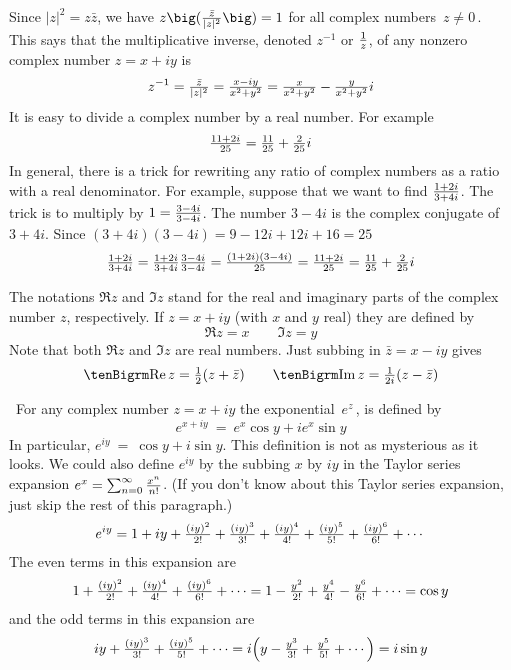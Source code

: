 Since $|z|^2=z\bar z$, we have $z\big({ \bar z\over |z|^2}\big)=1$
for all complex numbers $\, z\ne 0\, $. This says that the multiplicative
inverse, denoted $z^{-1}$ or $\sfrac{1}{z}$, of any nonzero complex number
$z=x+iy$ is
$$
z^{-1}=\sfrac{\bar z}{|z|^2}=\sfrac{x-iy}{x^2+y^2}
=\sfrac{x}{x^2+y^2}-\sfrac{y}{x^2+y^2}i
$$ 
It is easy to divide a complex number by
a real number. For example
$$
\sfrac{11+2i}{25} = \sfrac{11}{25}+\sfrac{2}{25}i
$$
In general, there is a trick for rewriting any ratio of complex numbers
as a ratio with a real denominator. For example, suppose that we want to
find $\sfrac{1+2i}{3+4i}$. The trick is to multiply by $1=\sfrac{3-4i}{3-4i}$.
The number $3-4i$ is the complex conjugate of
$3+4i$. Since $(3+4i)(3-4i)=9-12i+12i+16=25$
$$
\sfrac{1+2i}{3+4i}=\sfrac{1+2i}{3+4i}\sfrac{3-4i}{3-4i}
=\sfrac{(1+2i)(3-4i)}{25}
=\sfrac{11+2i}{25}
= \sfrac{11}{25}+\sfrac{2}{25}i
$$

The notations $\Re z$ and $\Im z$ stand for the real and imaginary parts of the 
complex number $z$, respectively. If $z=x+ iy$ (with $x$ and $y$ real) they
are defined by 
$$
\Re z=x\qquad \Im z=y
$$ 
Note that both $\Re z$ and $\Im z$ are real numbers.
Just subbing in  $\bar z=x-iy$ gives
$$
\Re z=\half(z+\bar z)\qquad \Im z=\sfrac{1}{2i}(z-\bar z)
$$

\goodbreak
\  
For any complex number $z=x+iy$ the exponential $\, e^z\, $, is defined
by
$$ 
e^{x+iy}\ =\ e^x\cos y+i e^x\sin y
$$
In particular, $e^{iy}\ =\ \cos y+i \sin y$.
This definition is not as mysterious as it looks. We could
also define $e^{iy}$ by the subbing $x$ by $iy$ in the Taylor series expansion
$e^x=\sum_{n=0}^\infty \sfrac{x^n}{n!}$. (If you don't know about this
Taylor series expansion, just skip the rest of this paragraph.)
$$
e^{iy} = 1 +iy +\sfrac{(iy)^2}{2!}+\sfrac{(iy)^3}{3!}+\sfrac{(iy)^4}{4!}
+\sfrac{(iy)^5}{5!}+\sfrac{(iy)^6}{6!}+\cdots
$$
The even terms in this expansion are
$$
1  +\sfrac{(iy)^2}{2!}+\sfrac{(iy)^4}{4!}+\sfrac{(iy)^6}{6!}+\cdots
=1  -\sfrac{y^2}{2!}+\sfrac{y^4}{4!}-\sfrac{y^6}{6!}+\cdots
=\cos y
$$
and the odd terms in this expansion are
$$
 iy +\sfrac{(iy)^3}{3!}+\sfrac{(iy)^5}{5!}+\cdots
=i\Big(y-\sfrac{y^3}{3!}+\sfrac{y^5}{5!}+\cdots\Big)
=i\sin y
$$


